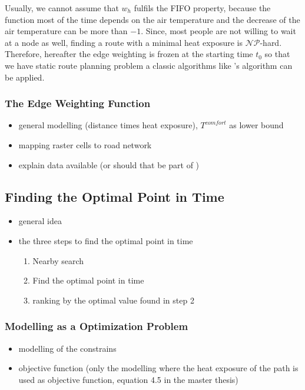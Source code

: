 Usually, we cannot assume that $w_h$ fulfils the FIFO property, because the function most of the time depends on the air temperature and the decrease of the air temperature can be more than $-1$. Since, most people are not willing to wait at a node as well, finding a route with a minimal heat exposure is $\mathcal{NP}$-hard. Therefore, 
hereafter the edge weighting is frozen at the starting time $t_0$ so that we have static route planning problem a classic algorithms like  \citeauthor{Dijkstra1959}'s algorithm \parencite{Dijkstra1959} can be applied. 

\subsubsection{The Edge Weighting Function}

\begin{itemize}
	\item general modelling (distance times heat exposure), $T^{comfort}$ as lower bound
	\item mapping raster cells to road network
	\item explain data available (or should that be part of )
\end{itemize}
 
 \subsection{Finding the Optimal Point in Time}
 
 \begin{itemize}
 	\item general idea
 	\item the three steps to find the optimal point in time
 		\begin{enumerate}
 			\item Nearby search
 			\item Find the optimal point in time
 			\item ranking by the optimal value found in step 2
 		\end{enumerate}
 \end{itemize}
 
 \subsubsection{Modelling as a Optimization Problem}
 
 \begin{itemize}
 	\item modelling of the constrains
 	\item objective function (only the modelling where the heat exposure of the path is used as objective function, equation 4.5 in the master thesis)
 \end{itemize}

